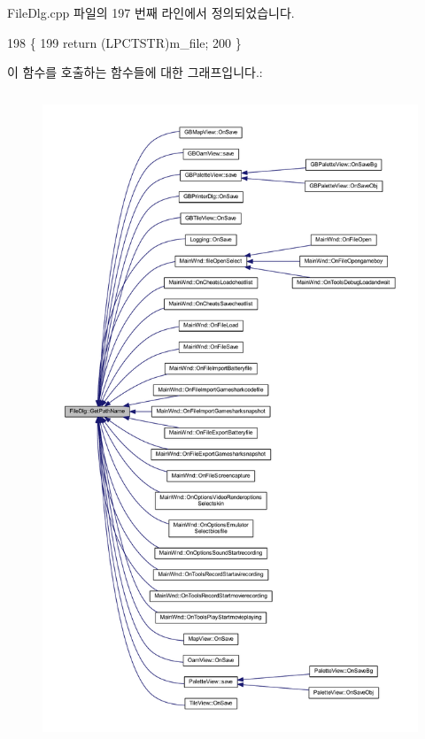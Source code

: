 File\+Dlg.\+cpp 파일의 197 번째 라인에서 정의되었습니다.


\begin{DoxyCode}
198 \{
199   \textcolor{keywordflow}{return} (LPCTSTR)m\_file;
200 \}
\end{DoxyCode}
이 함수를 호출하는 함수들에 대한 그래프입니다.\+:
\nopagebreak
\begin{figure}[H]
\begin{center}
\leavevmode
\includegraphics[height=550pt]{class_file_dlg_a52be84d9ca25a4d4dbb1f5e0ed1404bd_icgraph}
\end{center}
\end{figure}
\mbox{\label{class_file_dlg_a91dbefc4d06bedc4bd956838180dc3e8}} 

